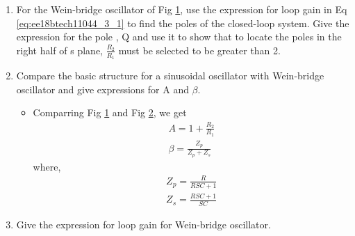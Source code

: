 \begin{enumerate}[label=\thesubsection.\arabic*.,ref=\thesubsection.\theenumi]
\item
For the Wein-bridge oscillator of Fig \ref{fig:ee18btech11044_3_tikz_1}, use the expression for loop gain in Eq \ref{eq:ee18btech11044_3_1}  to find the poles of the closed-loop system. Give the expression for the pole , Q and use it to show that to locate the poles in the right half of s plane, $\frac{R_2}{R_1}$ must be selected to be greater than 2. 

\begin{figure}[!hbt]
	\begin{center}
			\resizebox{\columnwidth}{!}{}
	\end{center}
\caption{}
\label{fig:ee18btech11044_3_tikz_1}
\end{figure}


\item Compare the basic structure for a sinusoidal oscillator with Wein-bridge oscillator and give expressions for A and $\beta$. 

\solution
\begin{itemize}
    \item Comparring Fig \ref{fig:ee18btech11044_3_tikz_1} and Fig \ref{fig:ee18btech11044_3_tikz_2}, we get
\begin{align}
A = 1+\frac{R_2}{R_1} \\
\beta = \frac{Z_p}{Z_p + Z_s}
\end{align}
where,
\begin{align}
    Z_p = \frac{R}{RSC+1} \\
    Z_s = \frac{RSC+1}{SC}
\end{align}
\end{itemize}



\begin{figure}[!hbt]
	\begin{center}
		\resizebox{\columnwidth}{!}{}
	\end{center}
\caption{}
\label{fig:ee18btech11044_3_tikz_2}
\end{figure} 





\item
Give the expression for loop gain for Wein-bridge oscillator. 


\end{enumerate}
